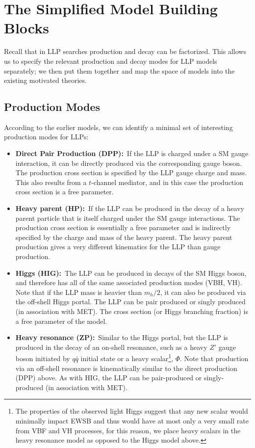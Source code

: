 \section{The Simplified Model Building Blocks}

Recall that in LLP searches production and decay can be factorized. This allows us to specify the relevant production and decay modes for LLP models separately; we then put them together and map the space of models into the existing motivated theories.

\subsection{Production Modes}
According to the earlier models, we can identify a minimal set of interesting production modes for LLPs:
%
\begin{itemize}
\item {\bf Direct Pair Production (DPP):}~If the LLP is charged under a SM gauge interaction, it can be directly produced via the corresponding gauge boson. The production cross section is specified by the LLP gauge charge and mass. This also results from a $t$-channel mediator, and in this case the production cross section is a free parameter.
\item {\bf Heavy parent (HP):}~If the LLP can be produced in the decay of a heavy parent particle that is itself charged under the SM gauge interactions. The production cross section is essentially a free parameter and is indirectly specified by the charge and mass of the heavy parent. The heavy parent production gives a very different kinematics for the LLP than gauge production.
\item {\bf Higgs (HIG):}~The LLP can be produced in decays of the SM Higgs boson, and therefore has all of the same associated production modes (VBH, VH). Note that if the LLP mass is heavier than $m_h/2$, it can also be produced via the off-shell Higgs portal. The LLP can be pair produced or singly produced (in association with MET). The cross section (or Higgs branching fraction) is a free parameter of the model.
\item {\bf Heavy resonance (ZP):}~Similar to the Higgs portal, but the LLP is produced in the decay of an on-shell resonance, such as a heavy $Z'$ gauge boson initiated by $q\bar{q}$ initial state or a heavy scalar\footnote{The properties of the observed light Higgs suggest that any new scalar would minimally impact EWSB and thus would have at most only a very small rate from VBF and VH processes, for this reason, we place heavy scalars in the heavy resonance model as opposed to the Higgs model above.}, $\Phi$.  Note that production via an off-shell resonance is kinematically similar to the direct production (DPP) above.  As with HIG, the LLP can be pair-produced or singly-produced (in association with MET). 

\end{itemize}
